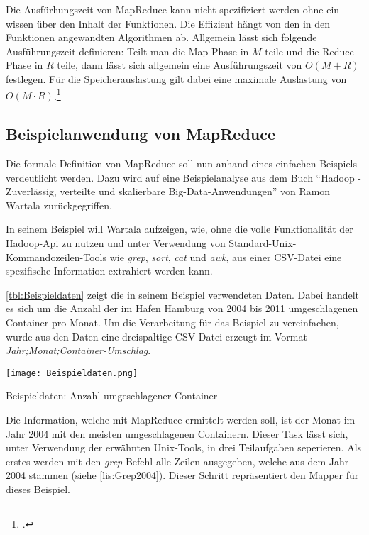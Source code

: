 Die Ausfürhungszeit von MapReduce kann nicht spezifiziert werden ohne ein wissen über den Inhalt der Funktionen. Die Effizient hängt von den in den Funktionen angewandten Algorithmen ab. Allgemein lässt sich folgende Ausführungszeit definieren: Teilt man die Map-Phase in $M$ teile und die Reduce-Phase in $R$ teile, dann lässt sich allgemein eine Ausführungszeit von $O(M+R)$ festlegen. Für die Speicherauslastung gilt dabei eine maximale Auslastung von $O(M \cdot R)$.\footcite[Vgl.][S. 5]{Dean.2004}

\subsection{Beispielanwendung von MapReduce}\label{subsec:Beispielanwendung}
Die formale Definition von MapReduce soll nun anhand eines einfachen Beispiels verdeutlicht werden. Dazu wird auf eine Beispielanalyse aus dem Buch "`Hadoop - Zuverlässig, verteilte und skalierbare Big-Data-Anwendungen"' von Ramon Wartala zurückgegriffen.

In seinem Beispiel will Wartala aufzeigen, wie, ohne die volle Funktionalität der Hadoop-Api zu nutzen und unter Verwendung von Standard-Unix-Kommandozeilen-Tools wie \textit{grep}, \textit{sort}, \textit{cat} und \textit{awk}, aus einer CSV-Datei eine spezifische Information extrahiert werden kann.

\autoref{tbl:Beispieldaten} zeigt die in seinem Beispiel verwendeten Daten. Dabei handelt es sich um die Anzahl der im Hafen Hamburg von 2004 bis 2011 umgeschlagenen Container pro Monat. Um die Verarbeitung für das Beispiel zu vereinfachen, wurde aus den Daten eine dreispaltige CSV-Datei erzeugt im Vormat \textit{Jahr;Monat;Container-Umschlag}.

\pagebreak
\begin{table}[h]
	\texttt{[image: Beispieldaten.png]}
	\caption{Beispieldaten: Anzahl umgeschlagener Container\footnotemark}
	\label{tbl:Beispieldaten}
\end{table}

Die Information, welche mit MapReduce ermittelt werden soll, ist der Monat im Jahr 2004 mit den meisten umgeschlagenen Containern. Dieser Task lässt sich, unter Verwendung der erwähnten Unix-Tools, in drei Teilaufgaben seperieren. Als erstes werden mit den \textit{grep}-Befehl alle Zeilen ausgegeben, welche aus dem Jahr 2004 stammen (siehe \autoref{lis:Grep2004}). Dieser Schritt repräsentiert den Mapper für dieses Beispiel. \\

